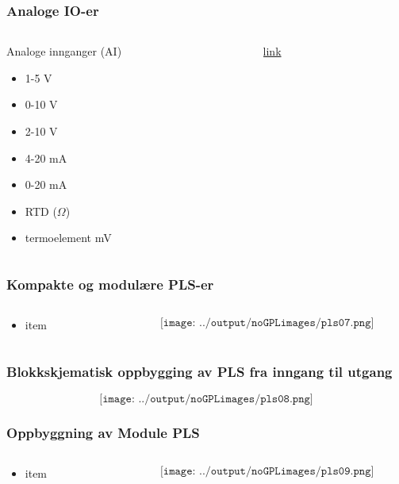 \documentclass[aspectratio=169,xcolor=dvipsnames]{beamer}
\begin{document}
\begin{frame}
	\frametitle{Analoge IO-er}
	\begin{columns}
		\begin{column}{0.5\textwidth}
			Analoge innganger (AI)
			\begin{itemize}
				\item 1-5 V
				\item 0-10 V
				\item 2-10 V
				\item 4-20 mA
				\item 0-20 mA
				\item RTD ($\Omega$)
				\item termoelement mV
			\end{itemize}

			
		\end{column}

		\begin{column}{0.5\textwidth}
			\href{https://www.contec.com/support/basic-knowledge/daq-control/analog-io/}{link}
		\end{column}
	\end{columns}
\end{frame}

\begin{frame}
	\frametitle{Kompakte og  modulære PLS-er}
	\begin{columns}
		\begin{column}{0.5\textwidth}
			\begin{itemize}
				\item item
			\end{itemize}

			
		\end{column}

		\begin{column}{0.5\textwidth}
	$$\texttt{[image: ../output/noGPLimages/pls07.png]}$$
		\end{column}
	\end{columns}
\end{frame}

\begin{frame}
	\frametitle{Blokkskjematisk oppbygging av PLS fra inngang til utgang}
	$$\texttt{[image: ../output/noGPLimages/pls08.png]}$$
\end{frame}

\begin{frame}
	\frametitle{Oppbyggning av Module PLS}
	\begin{columns}
		\begin{column}{0.5\textwidth}
			\begin{itemize}
				\item item
			\end{itemize}

			
		\end{column}

		\begin{column}{0.5\textwidth}
	$$\texttt{[image: ../output/noGPLimages/pls09.png]}$$
		\end{column}
	\end{columns}
\end{frame}
\end{document}
